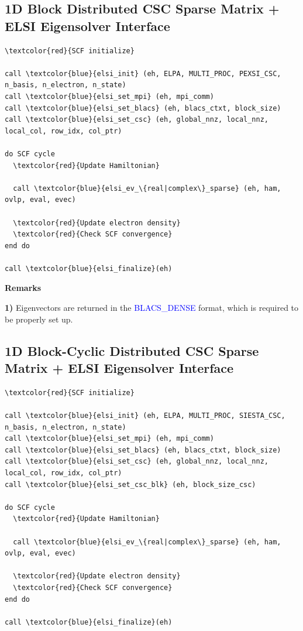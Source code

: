 \documentclass{report}
\begin{document}
\subsection*{1D Block Distributed CSC Sparse Matrix + ELSI Eigensolver Interface}
\begin{tcolorbox}
\begin{Verbatim}[commandchars=\\\{\}]
\textcolor{red}{SCF initialize}

call \textcolor{blue}{elsi_init} (eh, ELPA, MULTI_PROC, PEXSI_CSC, n_basis, n_electron, n_state)
call \textcolor{blue}{elsi_set_mpi} (eh, mpi_comm)
call \textcolor{blue}{elsi_set_blacs} (eh, blacs_ctxt, block_size)
call \textcolor{blue}{elsi_set_csc} (eh, global_nnz, local_nnz, local_col, row_idx, col_ptr)

do SCF cycle
  \textcolor{red}{Update Hamiltonian}

  call \textcolor{blue}{elsi_ev_\{real|complex\}_sparse} (eh, ham, ovlp, eval, evec)

  \textcolor{red}{Update electron density}
  \textcolor{red}{Check SCF convergence}
end do

call \textcolor{blue}{elsi_finalize}(eh)
\end{Verbatim}
\end{tcolorbox}

\textbf{Remarks}

\textbf{1)} Eigenvectors are returned in the \textcolor{blue}{BLACS\_DENSE} format, which is required to be properly set up.

\subsection*{1D Block-Cyclic Distributed CSC Sparse Matrix + ELSI Eigensolver Interface}
\begin{tcolorbox}
\begin{Verbatim}[commandchars=\\\{\}]
\textcolor{red}{SCF initialize}

call \textcolor{blue}{elsi_init} (eh, ELPA, MULTI_PROC, SIESTA_CSC, n_basis, n_electron, n_state)
call \textcolor{blue}{elsi_set_mpi} (eh, mpi_comm)
call \textcolor{blue}{elsi_set_blacs} (eh, blacs_ctxt, block_size)
call \textcolor{blue}{elsi_set_csc} (eh, global_nnz, local_nnz, local_col, row_idx, col_ptr)
call \textcolor{blue}{elsi_set_csc_blk} (eh, block_size_csc)

do SCF cycle
  \textcolor{red}{Update Hamiltonian}

  call \textcolor{blue}{elsi_ev_\{real|complex\}_sparse} (eh, ham, ovlp, eval, evec)

  \textcolor{red}{Update electron density}
  \textcolor{red}{Check SCF convergence}
end do

call \textcolor{blue}{elsi_finalize}(eh)
\end{Verbatim}
\end{tcolorbox}
\end{document}
